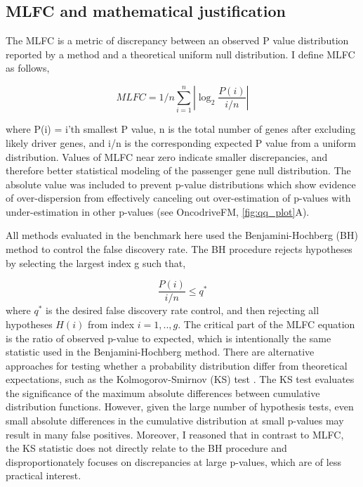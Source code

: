 \subsection{MLFC and mathematical justification}
\label{sec:mlfc_justification}

The MLFC is a metric of discrepancy between an observed P value distribution reported by a method and a theoretical uniform null distribution. I define MLFC as follows,

\begin{equation}
MLFC=1/n\sum_{i=1}^{n}{\left|\log_2{\frac{P(i)}{i/n}}\right|}
\end{equation}

where P(i) = i'th smallest P value, n is the total number of genes after excluding likely driver genes, and i/n is the corresponding expected P value from a uniform distribution. Values of MLFC near zero indicate smaller discrepancies, and therefore better statistical modeling of the passenger gene null distribution. The absolute value was included to prevent p-value distributions which show evidence of over-dispersion from effectively canceling out over-estimation of p-values with under-estimation in other p-values (see OncodriveFM, \autoref{fig:qq_plot}A).

All methods evaluated in the benchmark here used the Benjamini-Hochberg (BH) method \cite{RN94} to control the false discovery rate. The BH procedure rejects hypotheses by selecting the largest index g such that,

\begin{equation}
\frac{P(i)}{i/n} \leq q^*
\end{equation}
where $q^*$ is the desired false discovery rate control, and then rejecting all hypotheses $H(i)$ from index $i=1,..,g$. The critical part of the MLFC equation is the ratio of observed p-value to expected, which is intentionally the same statistic used in the Benjamini-Hochberg method. There are alternative approaches for testing whether a probability distribution differ from theoretical expectations, such as the Kolmogorov-Smirnov (KS) test \cite{RN100}. The KS test evaluates the significance of the maximum absolute differences between cumulative distribution functions. However, given the large number of hypothesis tests, even small absolute differences in the cumulative distribution at small p-values may result in many false positives. Moreover, I reasoned that in contrast to MLFC, the KS statistic does not directly relate to the BH procedure and disproportionately focuses on discrepancies at large p-values, which are of less practical interest.

